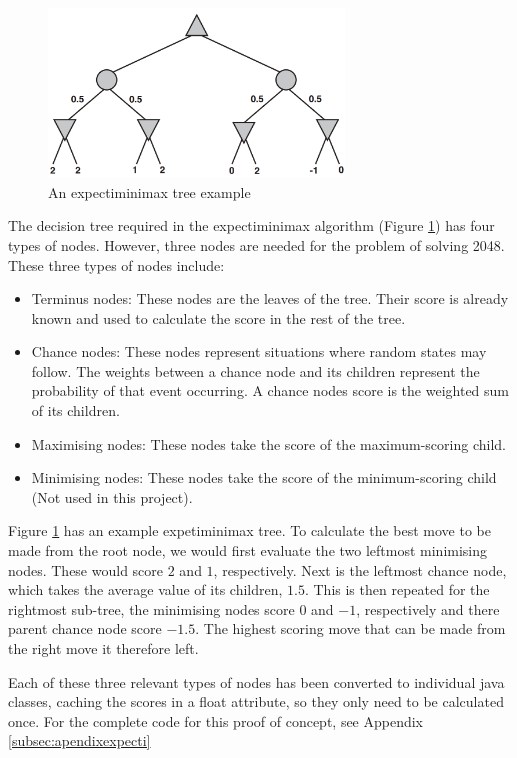 \documentclass{article}
\begin{document}
\label{subsec:expectimax}
\begin{figure}
    \centering
    \includegraphics[width=0.7\textwidth]{expectimax.png}
    \caption{An expectiminimax tree example \cite[p.~200]{russell2010artificial}}
    \label{fig:expectree}
\end{figure}
The decision tree required in the expectiminimax algorithm (Figure \ref{fig:expectree}) has four types of nodes. However, three nodes are needed for the problem of solving 2048. These three types of nodes include:
\begin{itemize}
    \item Terminus nodes: These nodes are the leaves of the tree. Their score is already known and used to calculate the score in the rest of the tree.
     \item Chance nodes: These nodes represent situations where random states may follow. The weights between
    a chance node and its children represent the probability of that event occurring. A chance node\textquotesingle s score is the weighted sum of its children.
    \item Maximising nodes: These nodes take the score of the maximum-scoring child.
    \item Minimising nodes: These nodes take the score of the minimum-scoring child (Not used in this project).
\end{itemize}

Figure \ref{fig:expectree} has an example expetiminimax tree. To calculate the best move to be made from the root node, we would first evaluate the two leftmost minimising nodes. These would score $2$ and $1$, respectively.
Next is the leftmost chance node, which takes the average value of its children, $1.5$. This is then repeated for the rightmost sub-tree, the minimising nodes score $0$ and $-1$, respectively and there parent chance node score $-1.5$. The highest scoring move that can be made from the right move it therefore left.

Each of these three relevant types of nodes has been converted to individual java classes, caching the scores in a float
attribute, so they only need to be calculated once.
For the complete code for this proof of concept, see Appendix \ref{subsec:apendixexpecti}
\end{document}
